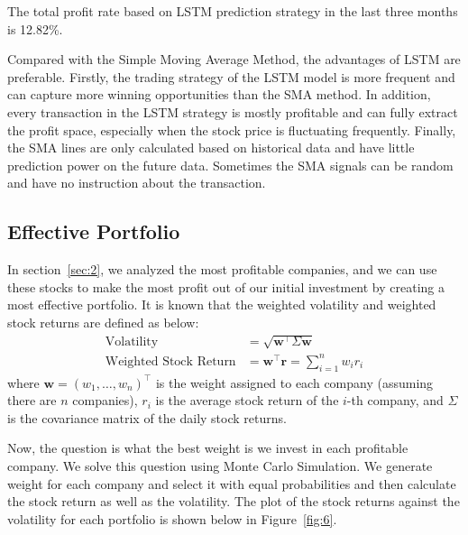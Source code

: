 \documentclass[a4paper, 11pt]{my-elegantpaper}
\begin{document}
The total profit rate based on LSTM prediction strategy in the last three months is 12.82\%.

Compared with the Simple Moving Average Method, the advantages of LSTM are preferable. Firstly, the trading strategy of the LSTM model is more frequent and can capture more winning opportunities than the SMA method. In addition, every transaction in the LSTM strategy is mostly profitable and can fully extract the profit space, especially when the stock price is fluctuating frequently. Finally, the SMA lines are only calculated based on historical data and have little prediction power on the future data. Sometimes the SMA signals can be random and have no instruction about the transaction.


\subsection{Effective Portfolio}

In section~\ref{sec:2}, we analyzed the most profitable companies, and we can use these stocks to make the most profit out of our initial investment by creating a most effective portfolio. It is known that the weighted volatility and weighted stock returns are defined as below: 
\begin{align*}
    \text{Volatility} &= \sqrt{\mathbf{w}^\top \Sigma \mathbf{w}} \\ 
    \text{Weighted Stock Return}
    &= \mathbf{w}^\top \mathbf{r}
    = \sum_{i=1}^n w_i r_i
\end{align*}
where $\mathbf{w} = (w_1, \ldots, w_n)^\top$ is the weight assigned to each company (assuming there are $n$ companies), $r_i$ is the average stock return of the $i$-th company, and $\Sigma$ is the covariance matrix of the daily stock returns.

Now, the question is what the best weight is we invest in each profitable company. We solve this question using Monte Carlo Simulation. We generate weight for each company and select it with equal probabilities and then calculate the stock return as well as the volatility. The plot of the stock returns against the volatility for each portfolio is shown below in Figure~\ref{fig:6}.
\end{document}
